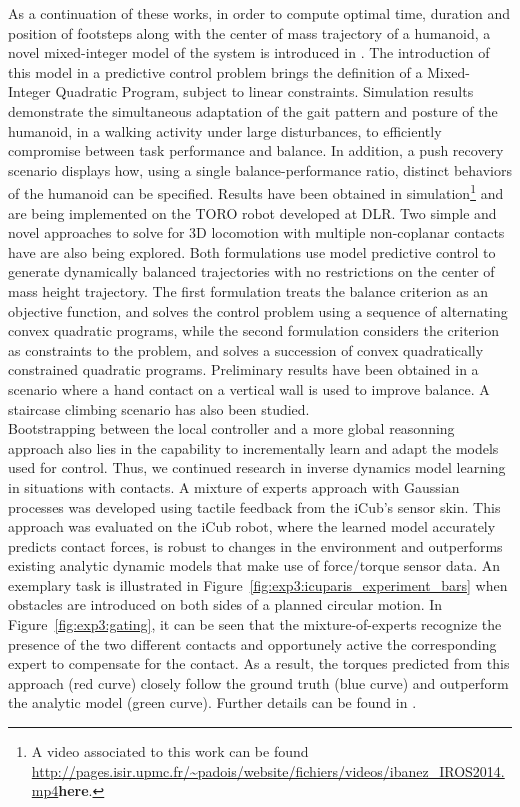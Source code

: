 \documentclass[final,5p,twocolumn]{elsarticle}
\begin{document}
As a  continuation of these works, in order to compute optimal time, duration and position of footsteps along with the center of mass trajectory of a humanoid, a novel mixed-integer model of the system is introduced in \cite{ibanezIROS2014}. The introduction of this model in a predictive control problem brings the definition of a Mixed-Integer Quadratic Program, subject to linear constraints. Simulation results demonstrate the simultaneous adaptation of the gait pattern and posture of the humanoid, in a walking activity under large disturbances, to efficiently compromise between task performance and balance. In addition, a push recovery scenario displays how, using a single balance-performance ratio, distinct behaviors of the humanoid can be specified. Results have been obtained in simulation\footnote{A video associated to this work can be found \url{http://pages.isir.upmc.fr/~padois/website/fichiers/videos/ibanez\_IROS2014.mp4}{\textbf{here}}.} and are being implemented on the TORO robot developed at DLR. Two simple and novel approaches to solve for 3D locomotion with multiple non-coplanar contacts have are also being explored. Both formulations use model predictive control to generate dynamically balanced trajectories with no restrictions on the center of mass height trajectory. The first formulation treats the balance criterion as an objective function, and solves the control problem using a sequence of alternating convex quadratic programs, while the second formulation considers the criterion as constraints to the problem, and solves a succession of convex quadratically constrained quadratic programs. Preliminary results have been obtained in a scenario where a hand contact on a vertical wall is used to improve balance. A staircase climbing scenario has also been studied.\\

Bootstrapping between the local controller and a more global reasonning approach also lies in the capability to incrementally learn and adapt the models used for control.
Thus, we continued research in inverse dynamics model learning in situations with contacts. A mixture of experts approach with
Gaussian processes was developed using tactile feedback from the iCub's sensor
skin. This approach was evaluated on the iCub robot, where the learned model
accurately predicts contact forces, is robust to changes in the environment and
outperforms existing analytic dynamic models that make use of force/torque
sensor data. 
An exemplary task is illustrated in Figure~\ref{fig:exp3:icuparis_experiment_bars} 
when obstacles are introduced on both sides of a planned circular motion.
In Figure~\ref{fig:exp3:gating}, it can be seen that the mixture-of-experts recognize the presence of the two different contacts and opportunely active the corresponding 
expert to compensate for the contact.
As a result, the torques predicted from this approach (red curve) closely follow the ground truth (blue curve) and outperform the analytic model (green curve).
Further details can be found in \cite{Calandra_ICRA15}. 
\end{document}
